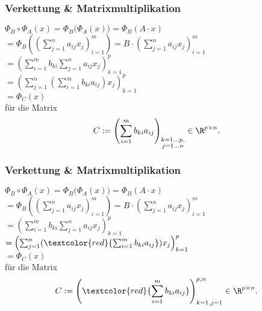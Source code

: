 \begin{frame}\frametitle{Verkettung \& Matrixmultiplikation}
	
$\Phi_B\circ \Phi_A(x) = \Phi_B\big(\Phi_A(x)\big)= \Phi_B(A\cdot x) $ \pause\\
\hspace{20mm}$=\Phi_B\left(\left( \sum_{j=1}^na_{ij}x_j \right)_{i=1}^{m}\right)	= B \cdot \left(\sum_{j=1}^na_{ij}x_j \right)_{i=1}^{m}$ \pause	\\
\hspace{20mm}$= \left( \sum_{i=1}^m b_{ki}\sum_{j=1}^na_{ij}x_j \right)_{k=1}^{p}$\\ \pause 
\hspace{20mm}$= \left( \sum_{j=1}^n (\sum_{i=1}^m b_{ki}a_{ij}) x_j \right)_{k=1}^{p}$ \pause	\\
\hspace{20mm}$= \Phi_C(x)$\\
	
	für die Matrix
	$$
		C:= \left(\sum_{i=1}^m b_{ki}a_{ij}\right)_{\substack{k=1\ldots p,\\ j=1\ldots n} } \in \R^{p \times n}.
	$$

\end{frame}
%
%
\begin{frame}\frametitle{Verkettung \& Matrixmultiplikation}
	
$\Phi_B\circ \Phi_A(x) = \Phi_B\big(\Phi_A(x)\big)= \Phi_B(A\cdot x) $ \\
\hspace{20mm}$=\Phi_B\left(\left( \sum_{j=1}^na_{ij}x_j \right)_{i=1}^{m}\right)	= B \cdot \left(\sum_{j=1}^na_{ij}x_j \right)_{i=1}^{m}$ 	\\
\hspace{20mm}$= \left( \sum_{i=1}^m b_{ki}\sum_{j=1}^na_{ij}x_j \right)_{k=1}^{p}$\\  
\hspace{20mm}$= \left( \sum_{j=1}^n (\textcolor{red}{\sum_{i=1}^m b_{ki}a_{ij}}) x_j \right)_{k=1}^{p}$ 	\\
\hspace{20mm}$= \Phi_C(x)$\\
	
	für die Matrix
	$$
		C:= \left(\textcolor{red}{\sum_{i=1}^m b_{ki}a_{ij}}\right)_{k=1, j=1}^{p, n}  \in \R^{p \times n}.
	$$

\end{frame}
%
%
